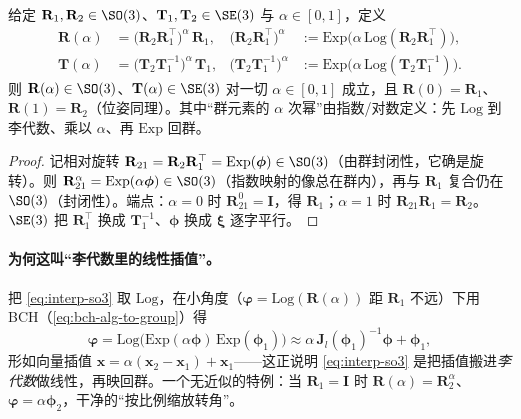 \begin{theorem}[李群上的测地插值（保群）]\label{thm:lie-interp}
给定 $\mathbf{R}_1,\mathbf{R}_2\in\SO(3)$、$\mathbf{T}_1,\mathbf{T}_2\in\SE(3)$ 与 $\alpha\in[0,1]$，定义
\begin{align}
  \mathbf{R}(\alpha)&=\big(\mathbf{R}_2\mathbf{R}_1^\top\big)^{\alpha}\,\mathbf{R}_1,
  &\big(\mathbf{R}_2\mathbf{R}_1^\top\big)^{\alpha}&:=\mathrm{Exp}\big(\alpha\,\mathrm{Log}(\mathbf{R}_2\mathbf{R}_1^\top)\big),\label{eq:interp-so3}\\
  \mathbf{T}(\alpha)&=\big(\mathbf{T}_2\mathbf{T}_1^{-1}\big)^{\alpha}\,\mathbf{T}_1,
  &\big(\mathbf{T}_2\mathbf{T}_1^{-1}\big)^{\alpha}&:=\mathrm{Exp}\big(\alpha\,\mathrm{Log}(\mathbf{T}_2\mathbf{T}_1^{-1})\big).\label{eq:interp-se3}
\end{align}
则 $\mathbf{R}(\alpha)\in\SO(3)$、$\mathbf{T}(\alpha)\in\SE(3)$ 对一切 $\alpha\in[0,1]$ 成立，且 $\mathbf{R}(0)=\mathbf{R}_1$、$\mathbf{R}(1)=\mathbf{R}_2$（位姿同理）。其中“群元素的 $\alpha$ 次幂”由指数/对数定义：先 $\mathrm{Log}$ 到李代数、乘以 $\alpha$、再 $\mathrm{Exp}$ 回群。
\end{theorem}
\begin{proof}
记相对旋转 $\mathbf{R}_{21}=\mathbf{R}_2\mathbf{R}_1^\top=\mathrm{Exp}(\boldsymbol{\phi})\in\SO(3)$（由群封闭性，它确是旋转）。则 $\mathbf{R}_{21}^{\alpha}=\mathrm{Exp}(\alpha\boldsymbol{\phi})\in\SO(3)$（指数映射的像总在群内），再与 $\mathbf{R}_1$ 复合仍在 $\SO(3)$（封闭性）。端点：$\alpha{=}0$ 时 $\mathbf{R}_{21}^0=\mathbf{I}$，得 $\mathbf{R}_1$；$\alpha{=}1$ 时 $\mathbf{R}_{21}\mathbf{R}_1=\mathbf{R}_2$。$\SE(3)$ 把 $\mathbf{R}_1^\top$ 换成 $\mathbf{T}_1^{-1}$、$\boldsymbol{\phi}$ 换成 $\boldsymbol{\xi}$ 逐字平行。
\end{proof}

\paragraph{为何这叫“李代数里的线性插值”。}
把 \cref{eq:interp-so3} 取 $\mathrm{Log}$，在小角度（$\boldsymbol{\varphi}=\mathrm{Log}(\mathbf{R}(\alpha))$ 距 $\mathbf{R}_1$ 不远）下用 BCH（\cref{eq:bch-alg-to-group}）得
\begin{equation}
  \boldsymbol{\varphi}=\mathrm{Log}\big(\mathrm{Exp}(\alpha\boldsymbol{\phi})\,\mathrm{Exp}(\boldsymbol{\phi}_1)\big)
  \approx\alpha\,\mathbf{J}_l(\boldsymbol{\phi}_1)^{-1}\boldsymbol{\phi}+\boldsymbol{\phi}_1,
  \label{eq:interp-loglinear}
\end{equation}
形如向量插值 $\mathbf{x}=\alpha(\mathbf{x}_2-\mathbf{x}_1)+\mathbf{x}_1$——这正说明 \cref{eq:interp-so3} 是把插值搬进\emph{李代数}做线性，再映回群。一个无近似的特例：当 $\mathbf{R}_1=\mathbf{I}$ 时 $\mathbf{R}(\alpha)=\mathbf{R}_2^{\alpha}$、$\boldsymbol{\varphi}=\alpha\boldsymbol{\phi}_2$，干净的“按比例缩放转角”。

